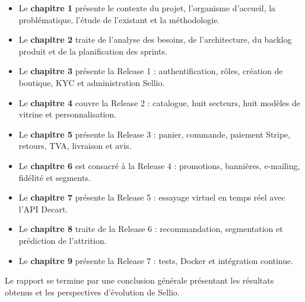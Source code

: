 \documentclass[a4paper,12pt]{report}
\begin{document}
\begin{itemize}
\item Le \textbf{chapitre 1} présente le contexte du projet, l'organisme d'accueil, la problématique, l'étude de l'existant et la méthodologie.
\item Le \textbf{chapitre 2} traite de l'analyse des besoins, de l'architecture, du backlog produit et de la planification des sprints.
\item Le \textbf{chapitre 3} présente la Release 1 : authentification, rôles, création de boutique, KYC et administration Sellio.
\item Le \textbf{chapitre 4} couvre la Release 2 : catalogue, huit secteurs, huit modèles de vitrine et personnalisation.
\item Le \textbf{chapitre 5} présente la Release 3 : panier, commande, paiement Stripe, retours, TVA, livraison et avis.
\item Le \textbf{chapitre 6} est consacré à la Release 4 : promotions, bannières, e-mailing, fidélité et segments.
\item Le \textbf{chapitre 7} présente la Release 5 : essayage virtuel en temps réel avec l'API Decart.
\item Le \textbf{chapitre 8} traite de la Release 6 : recommandation, segmentation et prédiction de l'attrition.
\item Le \textbf{chapitre 9} présente la Release 7 : tests, Docker et intégration continue.
\end{itemize}

Le rapport se termine par une conclusion générale présentant les résultats obtenus et les perspectives d'évolution de Sellio.
















  {}
  {}
\end{document}
